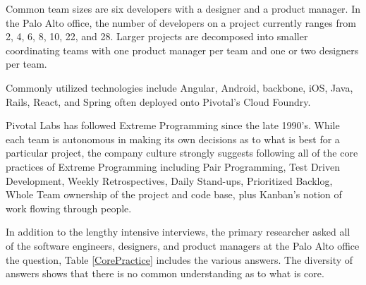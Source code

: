 Common team sizes are six developers with a designer and a product manager. In the Palo Alto office, the number of developers on a project currently ranges from 2, 4, 6, 8, 10, 22, and 28. Larger projects are decomposed into smaller coordinating teams with one product manager per team and one or two designers per team. 

Commonly utilized technologies include Angular, Android, backbone, iOS, Java, Rails, React, and Spring often deployed onto Pivotal's Cloud Foundry. 

Pivotal Labs has followed Extreme Programming \cite{ExtremeProgramming2004} since the late 1990's. While each team is autonomous in making its own decisions as to what is best for a particular project, the company culture strongly suggests following all of the core practices of Extreme Programming including Pair Programming, Test Driven Development, Weekly Retrospectives, Daily Stand-ups, Prioritized Backlog, Whole Team ownership of the project and code base, plus Kanban's notion of work flowing through people.

In addition to the lengthy intensive interviews, the primary researcher asked all of the software engineers, designers, and product managers at the Palo Alto office the question,  Table \ref{CorePractice} includes the various answers. The diversity of answers shows that there is no common understanding as to what is core. 

